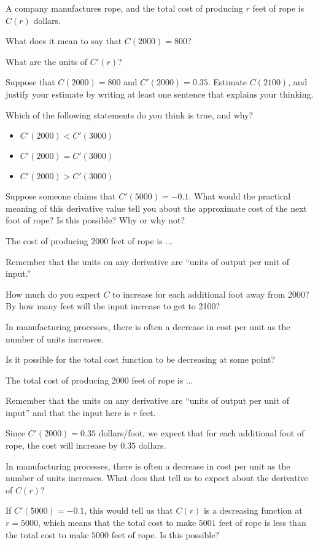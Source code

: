 \begin{activity} \label{A:2.1.6}
A company manufactures rope, and the total cost of producing $r$ feet of rope is $C(r)$ dollars.
\ba
	\item What does it mean to say that $C(2000) = 800$?

	\item What are the units of $C'(r)$?

	\item Suppose that $C(2000) = 800$ and $C'(2000) = 0.35$.  Estimate $C(2100)$, and justify your estimate by writing at least one sentence that explains your thinking.

	\item Which of the following statements do you think is true, and why?
	\begin{itemize}
		\item $C'(2000) < C'(3000)$
		\item $C'(2000) = C'(3000)$
		\item $C'(2000) > C'(3000)$
	\end{itemize}

	\item Suppose someone claims that $C'(5000) = -0.1$.  What would the practical meaning of this derivative value tell you about the approximate cost of the next foot of rope?  Is this possible?  Why or why not?  
\ea
\end{activity}
\begin{smallhint}
\ba
	\item The cost of producing 2000 feet of rope is $\ldots$
	\item Remember that the units on any derivative are ``units of output per unit of input.''
	\item How much do you expect $C$ to increase for each additional foot away from 2000?  By how many feet will the input increase to get to 2100?
	\item In manufacturing processes, there is often a decrease in cost per unit as the number of units increases.
	\item Is it possible for the total cost function to be decreasing at some point?
\ea
\end{smallhint}
\begin{bighint}
\ba
	\item The total cost of producing 2000 feet of rope is $\ldots$
	\item Remember that the units on any derivative are ``units of output per unit of input'' and that the input here is $r$ feet.
	\item Since $C'(2000) = 0.35$ dollars/foot, we expect that for each additional foot of rope, the cost will increase by $0.35$ dollars.
	\item In manufacturing processes, there is often a decrease in cost per unit as the number of units increases.  What does that tell us to expect about the derivative of $C(r)$?
	\item If $C'(5000) = -0.1$, this would tell us that $C(r)$ is a decreasing function at $r = 5000$, which means that the total cost to make $5001$ feet of rope is less than the total cost to make $5000$ feet of rope.  Is this possible?
\ea
\end{bighint}
